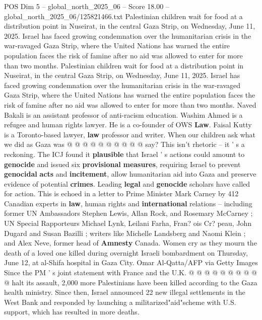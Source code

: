 \begin{textsample}{POS Dim 5 – global\_north\_2025\_06 – Score 18.00 – global\_north\_2025\_06/125821466.txt}  \label{ex:f5_pos_082}
Palestinian children wait for food at a distribution point in Nuseirat, in the central Gaza Strip, on Wednesday, June 11, 2025.
Israel has faced growing condemnation over the humanitarian crisis in the war-ravaged Gaza Strip, where the United Nations has warned the entire population faces the risk of famine after no aid was allowed to enter for more than two months.
Palestinian children wait for food at a distribution point in Nuseirat, in the central Gaza Strip, on Wednesday, June 11, 2025.
Israel has faced growing condemnation over the humanitarian crisis in the war-ravaged Gaza Strip, where the United Nations has warned the entire population faces the risk of famine after no aid was allowed to enter for more than two months.
Naved Bakali is an assistant professor of anti-racism education.
Washim Ahmed is a refugee and human rights lawyer.
He is a co-founder of OWS \textbf{Law}.
Faisal Kutty is a Toronto-based lawyer, \textbf{law} professor and writer.
When our children ask what we did as Gaza was @ @ @ @ @ @ @ @ @ @ say?
This isn't rhetoric -- it ' s a reckoning.
The ICJ found it \textbf{plausible} that Israel ' s actions could amount to \textbf{genocide} and issued six \textbf{provisional} \textbf{measures}, requiring Israel to prevent \textbf{genocidal} \textbf{acts} and \textbf{incitement}, allow humanitarian aid into Gaza and preserve evidence of potential \textbf{crimes}.
Leading \textbf{legal} and \textbf{genocide} scholars have called for action.
This is echoed in a letter to Prime Minister Mark Carney by 412 Canadian experts in \textbf{law}, human rights and \textbf{international} relations -- including former UN Ambassadors Stephen Lewis, Allan Rock, and Rosemary McCarney ; UN Special Rapporteurs Michael Lynk, Leilani Farha, Fran? ois Cr? peau, John Dugard and Susan Bazilli ; writers like Michelle Landsberg and Naomi Klein ; and Alex Neve, former head of \textbf{Amnesty} Canada.
Women cry as they mourn the death of a loved one killed during overnight Israeli bombardment on Thursday, June 12, at al-Shifa hospital in Gaza City.
Omar Al-Qatta/AFP via Getty Images Since the PM ' s joint statement with France and the U.K. @ @ @ @ @ @ @ @ @ @ halt its assault, 2,000 more Palestinians have been killed according to the Gaza health ministry.
Since then, Israel announced 22 new illegal settlements in the West Bank and responded by launching a militarized"aid"scheme with U.S. support, which has resulted in more deaths.

\end{textsample}
